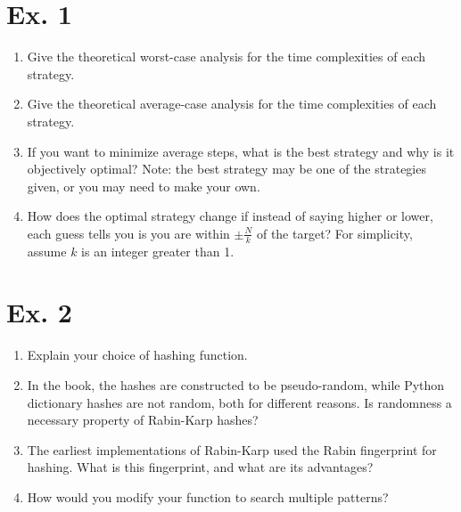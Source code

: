 \documentclass{article}
\begin{document}
\section{Ex. 1}
\begin{enumerate}
    \item Give the theoretical worst-case analysis for the time complexities of each strategy.
    \item Give the theoretical average-case analysis for the time complexities of each strategy.
    \item If you want to minimize average steps, what is the best strategy and why is it objectively optimal? Note: the best strategy may be one of the strategies given, or you may need to make your own.
    \item How does the optimal strategy change if instead of saying higher or lower, each guess tells you is you are within $\pm \frac{N}{k}$ of the target? For simplicity, assume $k$ is an integer greater than 1.
\end{enumerate}

\section{Ex. 2}
\begin{enumerate}
    \item Explain your choice of hashing function.  
    \item  In the book, the hashes are constructed to be pseudo-random, while Python dictionary hashes are not random, both for different reasons. Is randomness a necessary property of Rabin-Karp hashes?
    \item The earliest implementations of Rabin-Karp used the Rabin fingerprint for hashing. What is this fingerprint, and what are its advantages?  
    \item How would you modify your function to search multiple patterns? 

\end{enumerate}
\end{document}

